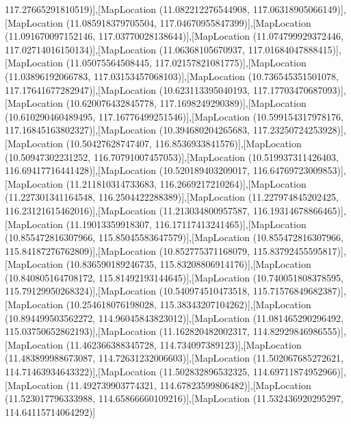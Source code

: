 117.27665291810519)],[MapLocation (11.082212276544908, 117.06318905066149)],[MapLocation (11.085918379705504, 117.04670955847399)],[MapLocation (11.091670097152146, 117.03770028138644)],[MapLocation (11.074799929372446, 117.02714016150134)],[MapLocation (11.06368105670937, 117.01684047888415)],[MapLocation (11.05075564508445, 117.02157821081775)],[MapLocation (11.03896192066783, 117.03153457068103)],[MapLocation (10.736545351501078, 117.17641677282947)],[MapLocation (10.623113395040193, 117.17703470687093)],[MapLocation (10.620076432845778, 117.1698249290389)],[MapLocation (10.610290460489495, 117.16776499251546)],[MapLocation (10.599154317978176, 117.16845163802327)],[MapLocation (10.394680204265683, 117.23250724253928)],[MapLocation (10.50427628747407, 116.8536933841576)],[MapLocation (10.50947302231252, 116.70791007457053)],[MapLocation (10.519937311426403, 116.69417716441428)],[MapLocation (10.520189403209017, 116.64769723009853)],[MapLocation (11.211810314733683, 116.2669217210264)],[MapLocation (11.227301341164548, 116.2504422288389)],[MapLocation (11.227974845202425, 116.23121615462016)],[MapLocation (11.213034800957587, 116.19314678866465)],[MapLocation (11.19013359918307, 116.17117413241465)],[MapLocation (10.855472816307966, 115.85045583647579)],[MapLocation (10.855472816307966, 115.84187276762809)],[MapLocation (10.852775371168079, 115.83792455595817)],[MapLocation (10.836590189246735, 115.83208806914176)],[MapLocation (10.840805164708172, 115.81492193144645)],[MapLocation (10.740051808378595, 115.79129950268324)],[MapLocation (10.540974510473518, 115.71576849682387)],[MapLocation (10.254618076198028, 115.38343207104262)],[MapLocation (10.894499503562272, 114.96045843823012)],[MapLocation (11.081465290296492, 115.03750652862193)],[MapLocation (11.162820482002317, 114.82929846986555)],[MapLocation (11.462366388345728, 114.734097389123)],[MapLocation (11.483899988673087, 114.72631232006603)],[MapLocation (11.502067685272621, 114.71463934643322)],[MapLocation (11.502832896532325, 114.69711874952966)],[MapLocation (11.492739903774321, 114.67823599806482)],[MapLocation (11.523017796333988, 114.65866660109216)],[MapLocation (11.532436920295297, 114.64115714064292)]